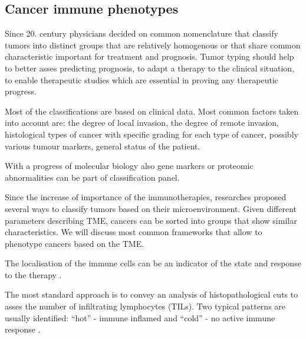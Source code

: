 \documentclass[12pt,]{book}
\theoremstyle{definition}
\theoremstyle{definition}
\theoremstyle{definition}
\theoremstyle{remark}
\begin{document}
\hypertarget{cancer-immune-phenotypes}{%
\subsection{Cancer immune phenotypes}\label{cancer-immune-phenotypes}}

Since 20. century physicians decided on common nomenclature that
classify tumors into distinct groups that are relatively homogenous or
that share common characteristic important for treatment and prognosis.
Tumor typing should help to better asses predicting prognosis, to adapt
a therapy to the clinical situation, to enable therapeutic studies which
are essential in proving any therapeutic progress.

Most of the classifications are based on clinical data. Most common
factors taken into account are: the degree of local invasion, the degree
of remote invasion, histological types of cancer with specific grading
for each type of cancer, possibly various tumour markers, general status
of the patient.

With a progress of molecular biology also gene markers or proteomic
abnormalities can be part of classification panel.

Since the increase of importance of the immunotherapies, researches
proposed several ways to classify tumors based on their
microenvironment. Given different parameters describing TME, cancers can
be sorted into groups that show similar characteristics. We will discuss
most common frameworks that allow to phenotype cancers based on the TME.

The localisation of the immune cells can be an indicator of the state
and response to the therapy \citep{Bindea2013}.

The most standard approach is to convey an analysis of histopathological
cuts to asses the number of infiltrating lymphocytes (TILs). Two typical
patterns are usually identified: ``hot'' - immune inflamed and ``cold''
- no active immune response \citep{Berghoff2018}.
\end{document}
